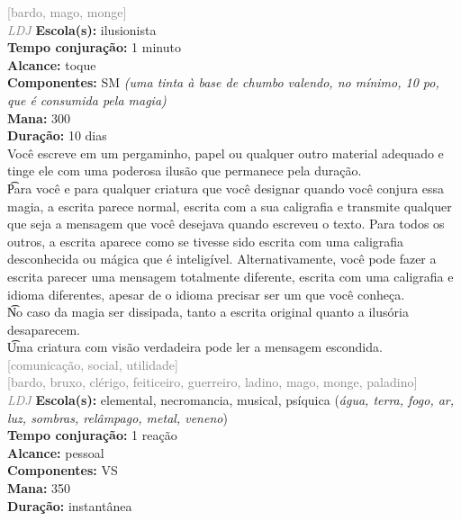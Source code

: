 \documentclass{RPG_Adventure}[2021/10/20]
\begin{document}
{\scriptsize \textcolor{gray}{[bardo, mago, monge]\\}}
{\tiny \textcolor{gray}{\textit{LDJ}}}
{\small \t \textbf{Escola(s):} ilusionista\\\t \textbf{Tempo conjuração:} 1 minuto\\\t \textbf{Alcance:} toque\\\t \textbf{Componentes:} SM \textit{(uma tinta à base de chumbo valendo, no mínimo, 10 po, que é consumida pela magia)}\\\t \textbf{Mana:} 300\\\t \textbf{Duração:} 10 dias\\}
{\normalsize Você escreve em um pergaminho, papel ou qualquer outro material adequado e tinge ele com uma poderosa ilusão que permanece pela duração.\\\t Para você e para qualquer criatura que você designar quando você conjura essa magia, a escrita parece normal, escrita com a sua caligrafia e transmite qualquer que seja a mensagem que você desejava quando escreveu o texto. Para todos os outros, a escrita aparece como se tivesse sido escrita com uma caligrafia desconhecida ou mágica que é inteligível. Alternativamente, você pode fazer a escrita parecer uma mensagem totalmente diferente, escrita com uma caligrafia e idioma diferentes, apesar de o idioma precisar ser um que você conheça.\\\t No caso da magia ser dissipada, tanto a escrita original quanto a ilusória desaparecem.\\\t Uma criatura com visão verdadeira pode ler a mensagem escondida.\\}
{\scriptsize \textcolor{gray}{[comunicação, social, utilidade]\\}}
{\scriptsize \textcolor{gray}{[bardo, bruxo, clérigo, feiticeiro, guerreiro, ladino, mago, monge, paladino]\\}}
{\tiny \textcolor{gray}{\textit{LDJ}}}
{\small \t \textbf{Escola(s):} elemental, necromancia, musical, psíquica (\textit{água, terra, fogo, ar, luz, sombras, relâmpago, metal, veneno})\\\t \textbf{Tempo conjuração:} 1 reação\\\t \textbf{Alcance:} pessoal\\\t \textbf{Componentes:} VS\\\t \textbf{Mana:} 350\\\t \textbf{Duração:} instantânea\\}
\end{document}
